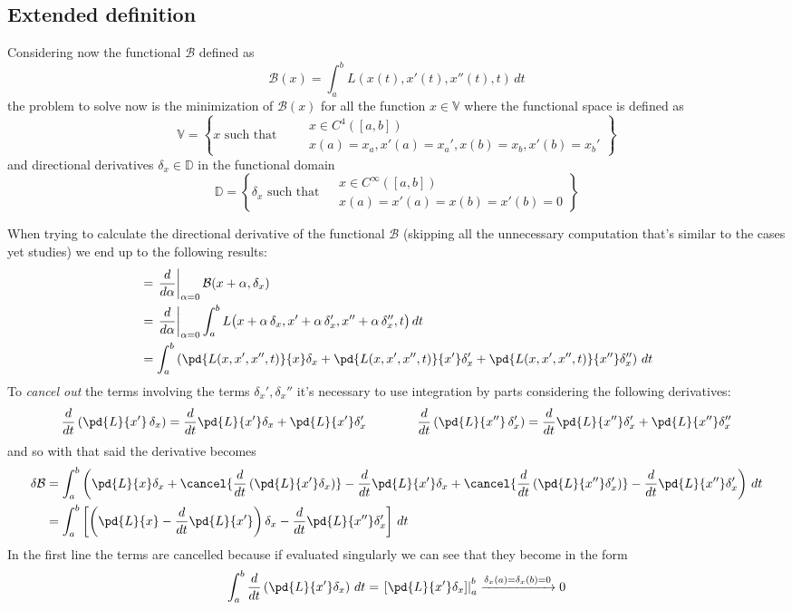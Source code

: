 	
	\subsection*{Extended definition}
	Considering now the functional $\mathcal B$ defined as
	\begin{equation} \label{eq:func:lag2}
		\mathcal B(x) = \int_a^b L (x(t),x'(t),x''(t),t)\, dt
	\end{equation}
	the problem to solve now is the minimization of $\mathcal B(x)$ for all the function $x\in \mathds V$ where the functional space is defined as
	\[ \mathds V = \left\{ x \textrm{ such that } \quad \begin{aligned}
		& x\in C^4([a,b]) \\ & x(a) = x_a, x'(a) = x_a', x(b) = x_b, x'(b) = x_b'
	\end{aligned} \right\} \]
	and directional derivatives $\delta_x \in \mathds D$ in the functional domain
	\[ \mathds D = \left\{ \delta_x \textrm{ such that } \begin{aligned}
		& x\in C^\infty([a,b]) \\ & x(a) = x'(a) = x(b) = x'(b) = 0
	\end{aligned} \right\} \]
	
	When trying to calculate the directional derivative of the functional $\mathcal B$ (skipping all the unnecessary computation that's similar to the cases yet studies) we end up to the following results:
	\begin{align*}
		& = \left.\frac{d}{d\alpha}\right|_{\alpha = 0} \mathcal B(x+\alpha, \delta_x) \\
		& = \left. \frac{d}{d\alpha}\right|_{\alpha = 0} \int_a^b L \big( x + \alpha\, \delta_x, x' + \alpha\, \delta_x', x''+\alpha\, \delta_x'',t\big) \, dt \\
		& = \int_a^b \left( \pd{L (x,x',x'',t)}{x}\delta_x + \pd{L (x,x',x'',t)}{x'}\delta_x' + \pd{L (x,x',x'',t)}{x''}\delta_x'' \right) \, dt
	\end{align*}
	To \textit{cancel out} the terms involving the terms $\delta_x',\delta_x''$ it's necessary to use integration by parts considering the following derivatives:
	\[ \frac d{dt} \left(\pd{L }{x'}\, \delta_x \right) = \frac d{dt} \pd{L }{x'} \delta_x + \pd{L }{x'} \delta_x' \qquad \qquad \frac d{dt} \left(\pd{L }{x''}\, \delta_x' \right) = \frac d{dt} \pd{L }{x''} \delta_x' + \pd{L }{x''}\delta_x''  \]
	and so with that said the derivative becomes
	\begin{align*}
		\delta \mathcal B& = \int_a^b \left( \pd{L }{x}\delta_x + \cancel{\frac d{dt} \left(\pd{L }{x'} \delta_x \right)} -  \frac{d}{dt} \pd{L }{x'} \delta_x + \cancel{\frac d{dt}\left( \pd{L }{x''} \delta_x' \right) } - \frac{d}{dt} \pd{L }{x''} \delta_x' \right)\, dt \\
		& = \int_a^b \left[\left( \pd{L }{x}  -  \frac{d}{dt} \pd{L }{x'} \right)\delta_x - \frac{d}{dt} \pd{L }{x''} \delta_x' \right]\, dt
	\end{align*}
	In the first line the terms are cancelled because if evaluated singularly we can see that they become in the form
	\[ \int_a^b \frac d{dt} \left(\pd{L }{x'} \delta_x\right) \, dt = \left. \left[ \pd{L }{x'} \delta_x \right]\right|_a^b \xrightarrow{\delta_x(a) = \delta_x(b) = 0} 0  \]
	
